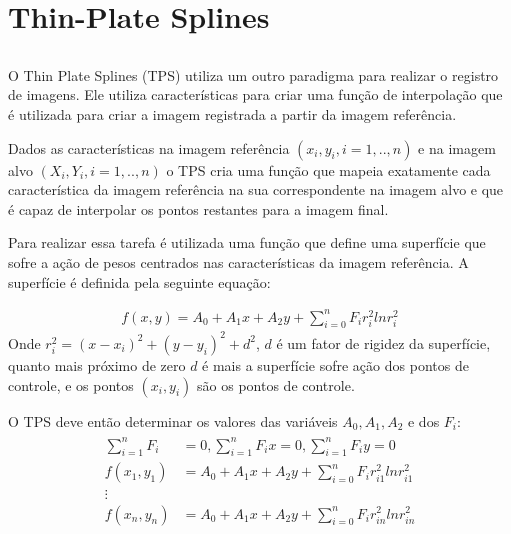 \documentclass[t]{beamer}
\begin{document}
\section{Thin-Plate Splines}
\subsection{}

\begin{frame}
    O Thin Plate Splines (TPS) utiliza um outro paradigma para realizar o registro de imagens. Ele utiliza
    características para criar uma função de interpolação que é utilizada para criar a imagem registrada a partir
    da imagem referência.

    Dados as características na imagem referência $(x_i,y_i, i=1,..,n)$ e na imagem alvo $(X_i,Y_i, i=1,..,n)$
o TPS cria uma função que mapeia exatamente cada característica da imagem referência na sua
correspondente na imagem alvo e que é capaz de interpolar os pontos restantes para a imagem final.
\end{frame}

\begin{frame}
Para realizar
essa tarefa é utilizada uma função que define uma superfície que sofre a ação de pesos centrados nas
características da imagem referência. A superfície é definida pela seguinte equação\cite{bookstein1989principal}:

\begin{align}
    f(x,y) = A_0 + A_1x + A_2y + \sum_{i=0}^n F_i r_i^2 ln r_i^2
\end{align}
Onde $r_i^2 = (x-x_i)^2 + (y-y_i)^2 + d^2$, $d$ é um fator de rigidez da superfície, quanto mais próximo de 
zero $d$ é mais a superfície sofre ação dos pontos de controle, e os pontos $(x_i, y_i)$ são os pontos de controle.
\end{frame}

\begin{frame}
    O TPS deve então determinar os valores das variáveis $A_0, A_1, A_2$ e dos $F_i$:
\begin{align}
\begin{split}
    \sum_{i=1}^n F_i &= 0, \sum_{i=1}^n F_ix = 0, \sum_{i=1}^n F_iy = 0 \\
    f(x_1,y_1) &= A_0 + A_1x + A_2y + \sum_{i=0}^n F_i r_{i1}^2 ln r_{i1}^2 \\
    \vdots \\
    f(x_n,y_n) &= A_0 + A_1x + A_2y + \sum_{i=0}^n F_i r_{in}^2 ln r_{in}^2
\end{split}
\end{align}
\end{frame}
\end{document}
